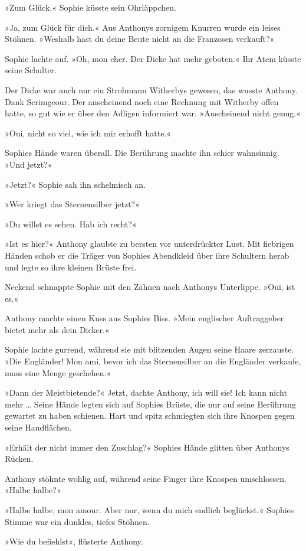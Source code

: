 »Zum Glück.« Sophie küsste sein Ohrläppchen.

»Ja, zum Glück für dich.« Aus Anthonys zornigem Knurren wurde ein
leises Stöhnen. »Weshalb hast du deine Beute nicht an die Franzosen
verkauft?«

Sophie lachte auf. »Oh, mon cher. Der Dicke hat mehr geboten.« Ihr
Atem küsste seine Schulter.

Der Dicke war auch nur ein Strohmann Witherbys gewesen, das wusste
Anthony. Dank Scrimgeour. Der anscheinend noch eine Rechnung mit
Witherby offen hatte, so gut wie er über den Adligen informiert
war. »Anscheinend nicht genug.«

»Oui, nicht so viel, wie ich mir erhofft hatte.«

Sophies Hände waren überall. Die Berührung machte ihn schier
wahnsinnig. »Und jetzt?«

»Jetzt?« Sophie sah ihn schelmisch an.

»Wer kriegt das Sternensilber jetzt?«

»Du willst es sehen. Hab ich recht?«

»Ist es hier?« Anthony glaubte zu bersten vor unterdrückter Lust.
Mit fiebrigen Händen schob er die Träger von Sophies Abendkleid
über ihre Schultern herab und legte so ihre kleinen Brüste frei.

Neckend schnappte Sophie mit den Zähnen nach Anthonys Unterlippe.
»Oui, ist es.«

Anthony machte einen Kuss aus Sophies Biss. »Mein englischer
Auftraggeber bietet mehr als dein Dicker.«

Sophie lachte gurrend, während sie mit blitzenden Augen seine Haare
zerzauste. »Die Engländer! Mon ami, bevor ich das Sternensilber an
die Engländer verkaufe, muss eine Menge geschehen.«

»Dann der Meistbietende?« Jetzt, dachte Anthony, ich will sie! Ich
kann nicht mehr … Seine Hände legten sich auf Sophies Brüste, die
nur auf seine Berührung gewartet zu haben schienen. Hart und spitz
schmiegten sich ihre Knospen gegen seine Handflächen.

»Erhält der nicht immer den Zuschlag?« Sophies Hände glitten über
Anthonys Rücken.

Anthony stöhnte wohlig auf, während seine Finger ihre Knospen
umschlossen. »Halbe halbe?«

»Halbe halbe, mon amour. Aber nur, wenn du mich endlich beglückst.«
Sophies Stimme war ein dunkles, tiefes Stöhnen.

»Wie du befiehlst«, flüsterte Anthony.

